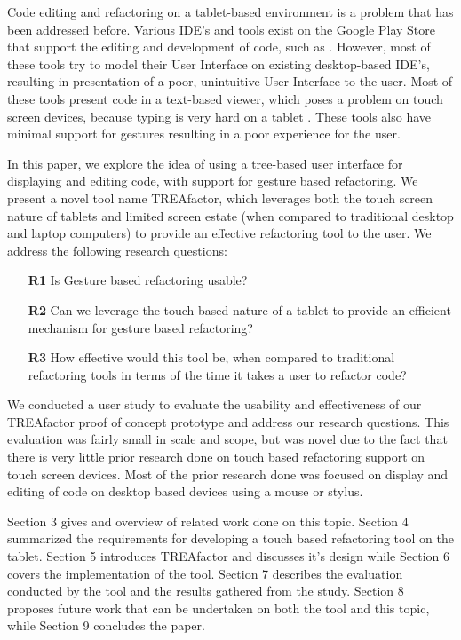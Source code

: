 \documentclass[10.5pt,twocolumn]{article}
\begin{document}
Code editing and refactoring on a tablet-based environment is a problem that has been addressed before. Various IDE’s and tools exist on the Google Play Store that support the editing and development of code, such as \cite{aide}. However, most of these tools try to model their User Interface on existing desktop-based IDE’s, resulting in presentation of a poor, unintuitive User Interface to the user. Most of these tools present code in a text-based viewer, which poses a problem on touch screen devices, because typing is very hard on a tablet \cite{Lu:2012:GCT:2207676.2208693}. These tools also have minimal support for gestures resulting in a poor experience for the user.


In this paper, we explore the idea of using a tree-based user interface for displaying and editing code, with support for gesture based refactoring. We present a novel tool name TREAfactor, which leverages both the touch screen nature of tablets and limited screen estate (when compared to traditional desktop and laptop computers) to provide an effective refactoring tool to the user. We address the following research questions:

\begin{itemize}
    \item [\textbf{R1}] Is Gesture based refactoring usable?
    \item [\textbf{R2}] Can we leverage the touch-based nature of a tablet to provide an efficient mechanism for gesture based refactoring?
    \item [\textbf{R3}] How effective would this tool be, when compared to traditional refactoring tools in terms of the time it takes a user to refactor code?
\end{itemize}

We conducted a user study to evaluate the usability and effectiveness of our TREAfactor proof of concept prototype and address our research questions. This evaluation was fairly small in scale and scope, but was novel due to the fact that there is very little prior research done on touch based refactoring support on touch screen devices. Most of the prior research done was focused on display and editing of code on desktop based devices using a mouse or stylus.

Section 3 gives and overview of related work done on this topic. Section 4 summarized the requirements for developing a touch based refactoring tool on the tablet. Section 5 introduces TREAfactor and discusses it's design while Section 6 covers the implementation of the tool. Section 7 describes the evaluation conducted by the tool and the results gathered from the study. Section 8 proposes future work that can be undertaken on both the tool and this topic, while Section 9 concludes the paper.
\end{document}

